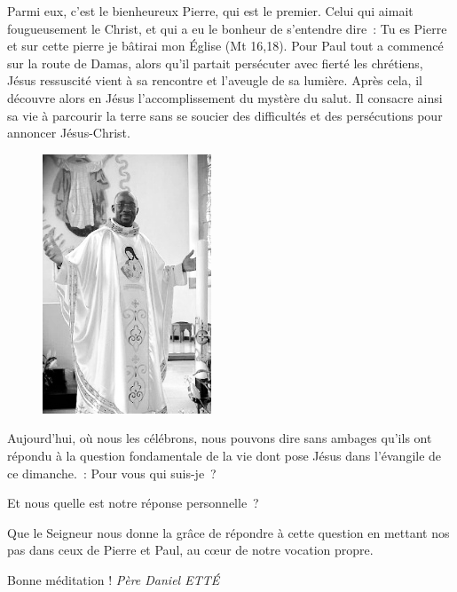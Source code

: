 Parmi eux, c’est le bienheureux Pierre, qui est le premier.
Celui qui aimait fougueusement le Christ, et qui a eu le bonheur de s’entendre dire : \og Tu es Pierre et sur cette pierre je bâtirai mon Église \og{} (Mt 16,18).
Pour Paul tout a commencé sur la route de Damas, alors qu’il partait persécuter avec fierté les chrétiens, Jésus ressuscité vient à sa rencontre et l’aveugle de sa lumière. Après cela, il découvre alors en Jésus l’accomplissement du mystère du salut. Il consacre ainsi sa vie à parcourir la terre sans se soucier des difficultés et des persécutions pour annoncer Jésus-Christ.
\begin{figure}
\vspace{-0.5cm}
	\includegraphics[scale=1.10]{../images/standing_daniel}
\end{figure}
Aujourd’hui, où nous les célébrons, nous pouvons dire sans ambages qu’ils ont répondu à la question fondamentale de la vie dont pose Jésus dans l’évangile de ce dimanche. : \og Pour vous qui suis-je ?\fg{}

Et nous quelle est notre réponse personnelle ?

Que le Seigneur nous donne la grâce de répondre à cette question en mettant nos pas dans ceux de Pierre et Paul, au cœur de notre vocation propre.

\begin{flushright}
Bonne méditation !
\textit{Père  Daniel  ETTÉ}
\end{flushright}


